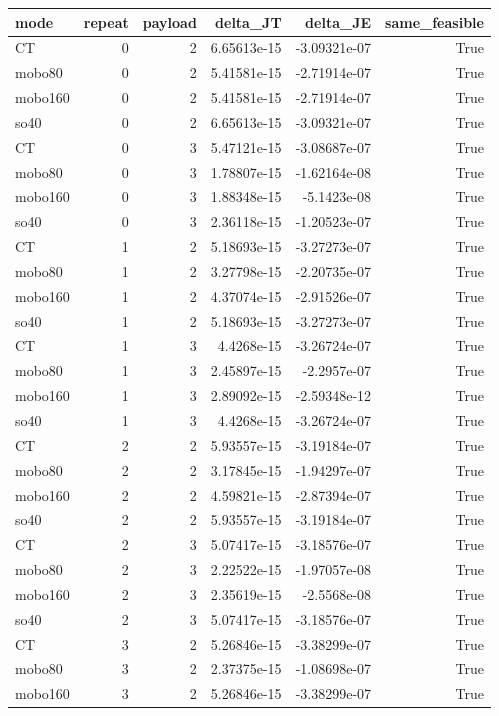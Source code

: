 \begin{tabular}{lrrrrr}
\toprule
mode & repeat & payload & delta\_JT & delta\_JE & same\_feasible \\
\midrule
CT & 0 & 2 & 6.65613e-15 & -3.09321e-07 & True \\
mobo80 & 0 & 2 & 5.41581e-15 & -2.71914e-07 & True \\
mobo160 & 0 & 2 & 5.41581e-15 & -2.71914e-07 & True \\
so40 & 0 & 2 & 6.65613e-15 & -3.09321e-07 & True \\
CT & 0 & 3 & 5.47121e-15 & -3.08687e-07 & True \\
mobo80 & 0 & 3 & 1.78807e-15 & -1.62164e-08 & True \\
mobo160 & 0 & 3 & 1.88348e-15 & -5.1423e-08 & True \\
so40 & 0 & 3 & 2.36118e-15 & -1.20523e-07 & True \\
CT & 1 & 2 & 5.18693e-15 & -3.27273e-07 & True \\
mobo80 & 1 & 2 & 3.27798e-15 & -2.20735e-07 & True \\
mobo160 & 1 & 2 & 4.37074e-15 & -2.91526e-07 & True \\
so40 & 1 & 2 & 5.18693e-15 & -3.27273e-07 & True \\
CT & 1 & 3 & 4.4268e-15 & -3.26724e-07 & True \\
mobo80 & 1 & 3 & 2.45897e-15 & -2.2957e-07 & True \\
mobo160 & 1 & 3 & 2.89092e-15 & -2.59348e-12 & True \\
so40 & 1 & 3 & 4.4268e-15 & -3.26724e-07 & True \\
CT & 2 & 2 & 5.93557e-15 & -3.19184e-07 & True \\
mobo80 & 2 & 2 & 3.17845e-15 & -1.94297e-07 & True \\
mobo160 & 2 & 2 & 4.59821e-15 & -2.87394e-07 & True \\
so40 & 2 & 2 & 5.93557e-15 & -3.19184e-07 & True \\
CT & 2 & 3 & 5.07417e-15 & -3.18576e-07 & True \\
mobo80 & 2 & 3 & 2.22522e-15 & -1.97057e-08 & True \\
mobo160 & 2 & 3 & 2.35619e-15 & -2.5568e-08 & True \\
so40 & 2 & 3 & 5.07417e-15 & -3.18576e-07 & True \\
CT & 3 & 2 & 5.26846e-15 & -3.38299e-07 & True \\
mobo80 & 3 & 2 & 2.37375e-15 & -1.08698e-07 & True \\
mobo160 & 3 & 2 & 5.26846e-15 & -3.38299e-07 & True \\

\end{tabular}
